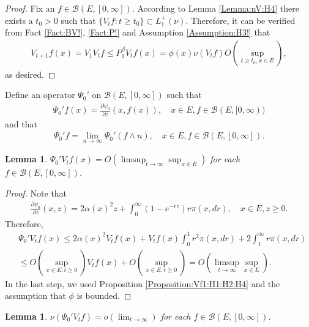 \documentclass[12pt,a4paper]{amsart}
\numberwithin{equation}{section}
\theoremstyle{plain}
\newtheorem{lem}[thm]{Lemma}
\theoremstyle{definition}
\theoremstyle{remark}
\begin{document}
\begin{proof}
Fix an $f\in \mathcal B(E,[0,\infty])$. 
According to Lemma \ref{Lemma:nV:H4} there exists a $t_0 > 0$ such that $\{V_tf:t\geq t_0\}\subset L_1^+(\nu)$. 
Therefore, it can be verified from Fact \ref{Fact:BV!}, \ref{Fact:P!} and Assumption \ref{Assumption:H3!} that
\begin{align}
 V_{t+1}f(x) 
  = V_1 V_t f
  \leq P_1^\beta V_t f(x)
  = \phi(x) \nu(V_tf) O(\sup_{t \geq t_0, x\in E}),
  \end{align}
as desired.
\end{proof}
Define an operator $\Psi_0'$ on $\mathcal B(E,[0,\infty])$ such that
\begin{align}
 \Psi_0' f(x) 
 = \frac{\partial \psi_0}{ \partial z} (x, f(x)),
 \quad x\in E, f\in \mathcal B(E,[0,\infty))
 \end{align}
and that
\begin{align}
 \Psi_0' f 
 = \lim_{n\to \infty} \Psi_0'(f\wedge n),
 \quad x\in E, f\in \mathcal B(E,[0,\infty]).
 \end{align}
\begin{lem} \label{Lemma:PsV:H1:H2:H4} 
$\Psi_0'V_tf(x) = O(\limsup_{t\to \infty} \sup_{x\in E})$ for each $f\in \mathcal B(E, [0,\infty])$.
\end{lem}
\begin{proof}
Note that 
\begin{align}
 \frac{\partial \psi_0 }{ \partial z} (x,z)
 = 2\alpha (x)^2 z + \int_0^\infty (1 - e^{- rz}) r \pi(x,dr), 
 \quad x\in E, z\geq 0.
  \end{align}
Therefore,
\begin{align}
  &\Psi_0' V_tf(x) 
  \leq 2\alpha (x)^2 V_t f(x) + V_t f(x) \int_0^1 r^2 \pi(x,dr) + 2\int_1^\infty r \pi(x,dr)
  \\&\leq O(\sup_{x\in E, t\geq 0})V_tf(x) + O(\sup_{x\in E, t\geq 0})
  = O(\limsup_{t\to \infty} \sup_{x\in E} ).
  \end{align}
In the last step, we used Proposition \ref{Proposition:Vf1:H1:H2:H4} and the assumption that $\phi$ is bounded.
\end{proof}
\begin{lem} \label{Lemma:nPPV:H1:H2:H4} 
 $\nu(\Psi_0' V_t f) = o(\lim_{t\to \infty})$ for each $f\in \mathcal B(E,[0,\infty])$.
\end{lem}
\end{document}
